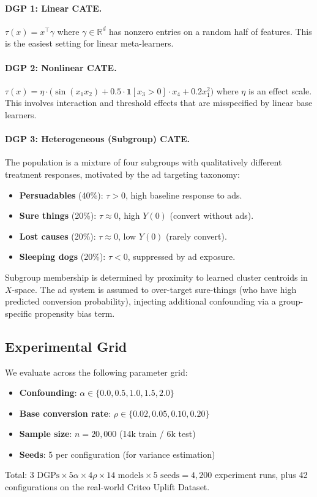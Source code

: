 \documentclass[10pt]{article}
\newcommand{\Y}[1]{Y(#1)}
\newcommand{\RR}{\mathbb{R}}
\begin{document}
\paragraph{DGP 1: Linear CATE.}
$\tau(x) = x^\top \gamma$ where $\gamma \in \RR^d$ has nonzero entries on a
random half of features. This is the easiest setting for linear meta-learners.

\paragraph{DGP 2: Nonlinear CATE.}
$\tau(x) = \eta \cdot \bigl(\sin(x_1 x_2) + 0.5 \cdot \mathbf{1}[x_3 > 0] \cdot x_4 + 0.2 x_1^2\bigr)$
where $\eta$ is an effect scale. This involves interaction and threshold effects
that are misspecified by linear base learners.

\paragraph{DGP 3: Heterogeneous (Subgroup) CATE.}
The population is a mixture of four subgroups with qualitatively different
treatment responses, motivated by the ad targeting taxonomy:
%
\begin{itemize}[topsep=2pt,itemsep=1pt,leftmargin=*]
  \item \textbf{Persuadables} (40\%): $\tau > 0$, high baseline response to ads.
  \item \textbf{Sure things} (20\%): $\tau \approx 0$, high $\Y{0}$ (convert without ads).
  \item \textbf{Lost causes} (20\%): $\tau \approx 0$, low $\Y{0}$ (rarely convert).
  \item \textbf{Sleeping dogs} (20\%): $\tau < 0$, suppressed by ad exposure.
\end{itemize}
%
Subgroup membership is determined by proximity to learned cluster centroids in
$X$-space. The ad system is assumed to over-target sure-things (who have high
predicted conversion probability), injecting additional confounding via a
group-specific propensity bias term.

\subsection{Experimental Grid}
\label{sec:grid}

We evaluate across the following parameter grid:
%
\begin{itemize}[topsep=2pt,itemsep=1pt]
  \item \textbf{Confounding}: $\alpha \in \{0.0, 0.5, 1.0, 1.5, 2.0\}$
  \item \textbf{Base conversion rate}: $\rho \in \{0.02, 0.05, 0.10, 0.20\}$
  \item \textbf{Sample size}: $n = 20{,}000$ (14k train / 6k test)
  \item \textbf{Seeds}: 5 per configuration (for variance estimation)
\end{itemize}
%
Total: $3 \text{ DGPs} \times 5 \alpha \times 4 \rho \times 14 \text{ models}
\times 5 \text{ seeds} = 4{,}200$ experiment runs, plus 42 configurations
on the real-world Criteo Uplift Dataset.
\end{document}

